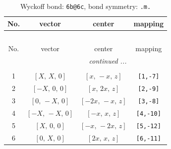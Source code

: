 \documentclass[fleqn,8pt]{jsarticle}
\begin{document}
\begin{longtable}{cccc}
\caption{Wyckoff bond: {\tt 6b@6c}, bond symmetry: {\tt .m.}}
 \\
 \hline \hline
No. & vector & center & mapping \\ \hline \endfirsthead

\multicolumn{3}{l}{\tablename\ \thetable{}} \\
 \hline \hline
No. & vector & center & mapping \\ \hline \endhead

 \hline \hline
\multicolumn{3}{r}{\footnotesize\it continued ...} \\ \endfoot

 \hline \hline
\multicolumn{3}{r}{} \\ \endlastfoot

1 & $\left[ X,\, X,\, 0 \right]$ & $\left[ x,\, - x,\, z \right]$ & {\tt [1,-7]} \\ \hline
2 & $\left[ - X,\, 0,\, 0 \right]$ & $\left[ x,\, 2 x,\, z \right]$ & {\tt [2,-9]} \\ \hline
3 & $\left[ 0,\, - X,\, 0 \right]$ & $\left[ - 2 x,\, - x,\, z \right]$ & {\tt [3,-8]} \\ \hline
4 & $\left[ - X,\, - X,\, 0 \right]$ & $\left[ - x,\, x,\, z \right]$ & {\tt [4,-10]} \\ \hline
5 & $\left[ X,\, 0,\, 0 \right]$ & $\left[ - x,\, - 2 x,\, z \right]$ & {\tt [5,-12]} \\ \hline
6 & $\left[ 0,\, X,\, 0 \right]$ & $\left[ 2 x,\, x,\, z \right]$ & {\tt [6,-11]} \\
\end{longtable}
\renewcommand{\arraystretch}{1.2}
\end{document}
